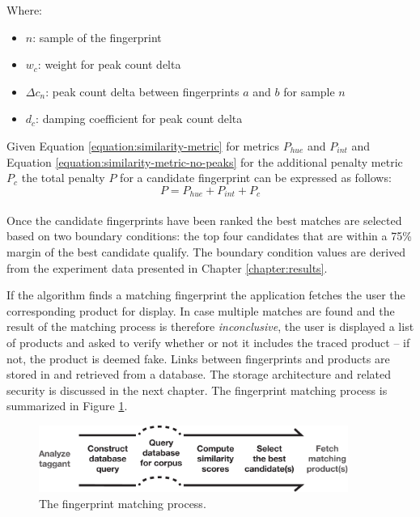 \documentclass[thesis.tex]{subfiles}
\begin{document}
Where:
\begin{itemize}[label=]
	\setlength\itemsep{0.10em}
    \item $n$: sample of the fingerprint
    \item $w_c$: weight for peak count delta
    \item $\Delta{c_n}$: peak count delta between fingerprints $a$ and $b$ for sample $n$
    \item $d_c$: damping coefficient for peak count delta
\end{itemize}
\enlargethispage{5\baselineskip}
\noindent Given Equation \ref{equation:similarity-metric} for metrics $P_{hue}$ and $P_{int}$ and Equation \ref{equation:similarity-metric-no-peaks} for the additional penalty metric $P_c$ the total penalty $P$ for a candidate fingerprint can be expressed as follows:
\begin{equation}
	P = P_{hue} + P_{int} + P_{c}
\end{equation}
\\
Once the candidate fingerprints have been ranked the best matches are selected based on two boundary conditions: the top four candidates that are within a 75\% margin of the best candidate qualify. The boundary condition values are derived from the experiment data presented in Chapter \ref{chapter:results}.

If the algorithm finds a matching fingerprint the application fetches the user the corresponding product for display. In case multiple matches are found and the result of the matching process is therefore \emph{inconclusive}, the user is displayed a list of products and asked to verify whether or not it includes the traced product -- if not, the product is deemed fake. Links between fingerprints and products are stored in and retrieved from a database. The storage architecture and related security is discussed in the next chapter. The fingerprint matching process is summarized in Figure \ref{figure:matching-process}.

\begin{figure}[h]
\centering \includegraphics[width=0.9\textwidth,height=\textheight,keepaspectratio=true]{images/design_implementation/matching_process}
\caption{The fingerprint matching process.\label{figure:matching-process}}
\end{figure}
\end{document}
